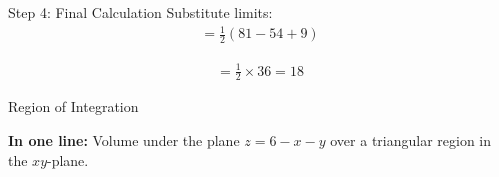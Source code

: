 \documentclass{beamer}
\begin{document}

\begin{frame}{Step 4: Final Calculation}
Substitute limits:
\begin{align}
= \frac{1}{2} \left( 81 - 54 + 9 \right)
\end{align}

\begin{align}
= \frac{1}{2} \times 36 = 18
\end{align}

\vspace{0.5cm}

\end{frame}


\begin{frame}{Region of Integration}

\noindent\textbf{In one line:} Volume under the plane $z = 6 - x - y$ over a triangular region in the $xy$-plane.
\end{frame}
\end{document}
